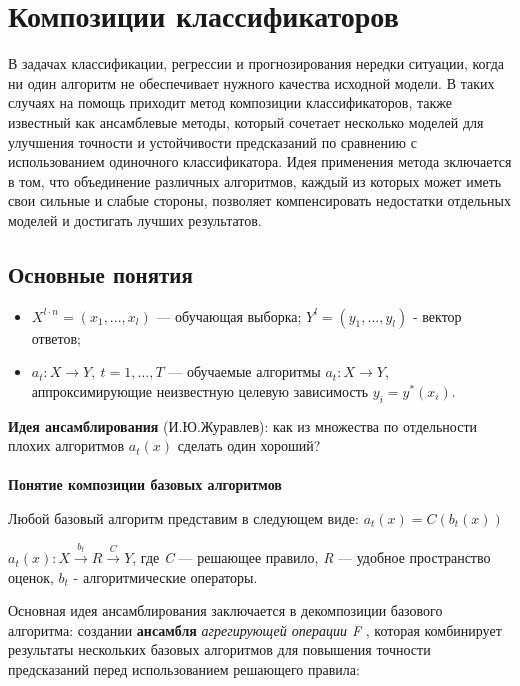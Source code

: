 \section{Композиции классификаторов}

В задачах классификации, регрессии и прогнозирования нередки ситуации,    когда ни один алгоритм не обеспечивает нужного качества исходной модели.  В таких случаях на помощь приходит метод композиции классификаторов, также известный как ансамблевые методы, который сочетает несколько моделей для улучшения точности и устойчивости предсказаний по сравнению с использованием одиночного классификатора. Идея применения метода зключается в том, что объединение различных алгоритмов, каждый из которых может иметь свои сильные и слабые стороны, позволяет компенсировать недостатки отдельных моделей и достигать лучших результатов.

\subsection{Основные понятия}

\begin{itemize}
    \item $X^{l \cdot n} = (x_1, ... , x_\textit{l})$ --- обучающая выборка; $Y^\textit{l} = (y_1, ... , y_\textit{l})$ - вектор ответов;
\item $a_t: X \to Y, \ t = 1, \dots, T$ --- обучаемые алгоритмы $a_t: X \to Y$, аппроксимирующие неизвестную целевую зависимость $y_i = y^*(x_i)$.
\end{itemize}
   \textbf{Идея ансамблирования} (И.Ю.Журавлев): как из множества по отдельности плохих алгоритмов \textit{$ a_t(x) $} сделать один хороший?\\ 
   \\ 
   \textbf{Понятие композиции базовых алгоритмов}  
   
   Любой базовый алгоритм представим в следующем виде: $ a_t(x) = C(b_t(x))$ 
   
   $a_t(x): \textit{X}  \overset{b_t}{\longrightarrow} \textit{R} \overset{C}{\longrightarrow} \textit{Y}$, где \textit{C} --- решающее правило, \textit{R} --- удобное пространство оценок, $b_t$ - алгоритмические операторы.

    Основная идея ансамблирования заключается в декомпозиции базового алгоритма: создании \textbf{ансамбля} \textit{агрегирующей операции F }, которая комбинирует результаты нескольких базовых алгоритмов для повышения точности предсказаний перед использованием решающего правила: 

